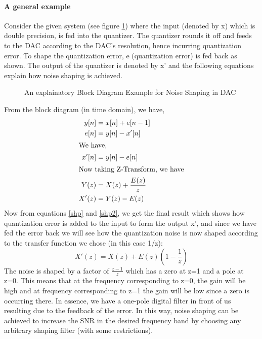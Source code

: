 \documentclass[a4paper,12pt]{article}
\begin{document}
    \paragraph{A general example}Consider the given system (see figure \ref{nshp}) where the input (denoted by x) which is double precision, is fed into the quantizer. The quantizer rounds it off and feeds to the DAC according to the DAC's resolution, hence incurring quantization error. To shape the quantization error, e (quantization error) is fed back as shown. The output of the quantizer is denoted by x' and the following equations explain how noise shaping is achieved.
	\begin{figure}[H]
  		\centering
  		
  		\caption{An explainatory Block Diagram Example for Noise Shaping in DAC}
		\label{nshp}
	\end{figure}
From the block diagram (in time domain), we have,
	\begin{align}
		y[n]&=x[n]+e[n-1]\\
		e[n]&=y[n]-x'[n]\\
		\intertext{We have,}
		x'[n]&=y[n]-e[n]\\
		\intertext{Now taking Z-Transform, we have}
		\label{shp}		
		Y(z)&=X(z)+\frac{E(z)}{z} \\
		\label{shp2}
		X'(z)&=Y(z)-E(z)
	\end{align}
Now from equations \ref{shp} and \ref{shp2}, we get the final result which shows how quantization error is added to the input to form the output x', and since we have fed the error back we will see how the quantization noise is now shaped according to the transfer function we chose (in this case 1/z):
\begin{equation}
X'(z)=X(z)+E(z)(1-\frac{1}{z})
\end{equation}
The noise is shaped by a factor of $\frac{z-1}{z}$ which has a zero at z=1 and a pole at z=0. This means that at the frequency corresponding to z=0, the gain will be high and at frequency corresponding to z=1 the gain will be low since a zero is occurring there. In essence, we have a one-pole digital filter in front of us resulting due to the feedback of the error. In this way, noise shaping can be achieved to increase the SNR in the desired frequency band by choosing any arbitrary shaping filter (with some restrictions).
\end{document}
